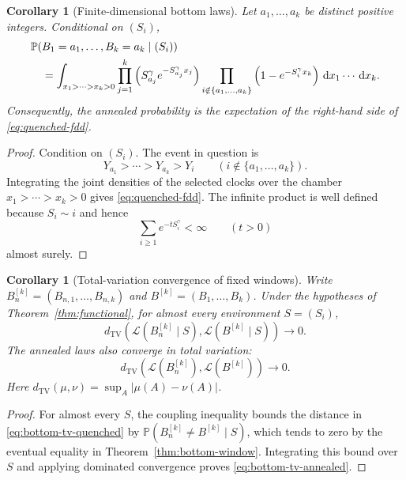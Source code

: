 \documentclass[11pt]{article}
\numberwithin{equation}{section}
\newtheorem{corollary}[theorem]{Corollary}
\theoremstyle{definition}
\theoremstyle{remark}
\newcommand{\Pp}{\mathbb P}
\newcommand{\dd}{\,\mathrm d}
\begin{document}
\begin{corollary}[Finite-dimensional bottom laws]
\label{cor:fdd}
Let $a_1,\ldots,a_k$ be distinct positive integers.  Conditional on $(S_i)$,
\begin{align}
 &\Pp(B_1=a_1,\ldots,B_k=a_k\mid(S_i))
 \notag\\
 &\quad=
 \int_{x_1>\cdots>x_k>0}
 \prod_{j=1}^k
 \left(S_{a_j}^\gamma e^{-S_{a_j}^\gamma x_j}\right)
 \prod_{i\notin\{a_1,\ldots,a_k\}}
 \left(1-e^{-S_i^\gamma x_k}\right)
 \dd x_1\cdots\dd x_k.
 \label{eq:quenched-fdd}
\end{align}
Consequently, the annealed probability is the expectation of the right-hand side of \eqref{eq:quenched-fdd}.
\end{corollary}

\begin{proof}
Condition on $(S_i)$.  The event in question is
\[
  Y_{a_1}>\cdots>Y_{a_k}>Y_i
  \qquad(i\notin\{a_1,\ldots,a_k\}).
\]
Integrating the joint densities of the selected clocks over the chamber $x_1>\cdots>x_k>0$ gives \eqref{eq:quenched-fdd}.  The infinite product is well defined because $S_i\sim i$ and hence
\[
  \sum_{i\geq1}e^{-tS_i^\gamma}<\infty
  \qquad(t>0)
\]
almost surely.
\end{proof}

\begin{corollary}[Total-variation convergence of fixed windows]
\label{cor:bottom-tv}
Write $B_n^{[k]}=(B_{n,1},\ldots,B_{n,k})$ and
$B^{[k]}=(B_1,\ldots,B_k)$.  Under the hypotheses of
Theorem~\ref{thm:functional}, for almost every environment $S=(S_i)$,
\begin{equation}
 d_{\mathrm{TV}}\!\left(
 \mathcal L(B_n^{[k]}\mid S),\mathcal L(B^{[k]}\mid S)\right)
 \longrightarrow0.
 \label{eq:bottom-tv-quenched}
\end{equation}
The annealed laws also converge in total variation:
\begin{equation}
 d_{\mathrm{TV}}\!\left(
 \mathcal L(B_n^{[k]}),\mathcal L(B^{[k]})\right)
 \longrightarrow0.
 \label{eq:bottom-tv-annealed}
\end{equation}
Here $d_{\mathrm{TV}}(\mu,\nu)=\sup_A|\mu(A)-\nu(A)|$.
\end{corollary}

\begin{proof}
For almost every $S$, the coupling inequality bounds the distance in
\eqref{eq:bottom-tv-quenched} by
$\Pp(B_n^{[k]}\neq B^{[k]}\mid S)$, which tends to zero by the eventual
equality in Theorem~\ref{thm:bottom-window}.  Integrating this bound over
$S$ and applying dominated convergence proves
\eqref{eq:bottom-tv-annealed}.
\end{proof}
\end{document}
